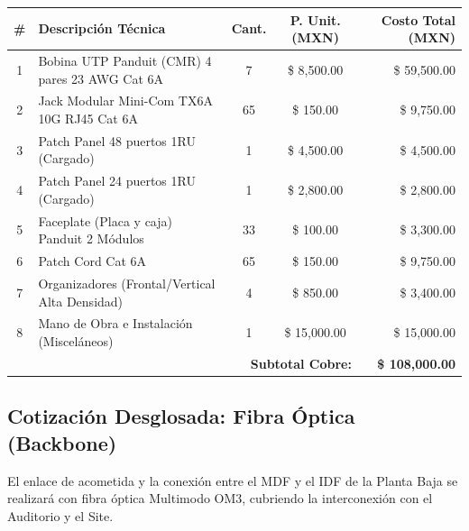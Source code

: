 \documentclass[11pt, letterpaper]{article}
\begin{document}
\begin{table}[h!]
\centering
{}
\renewcommand{\arraystretch}{1.3}
\begin{tabularx}{\textwidth}{@{} c X c c r @{}}
\toprule
\rowcolor{OroUNAM!20} %
\textbf{\#} & \textbf{Descripción Técnica} & \textbf{Cant.} & \textbf{P. Unit. (MXN)} & \textbf{Costo Total (MXN)} \\ \midrule
1 & Bobina UTP Panduit (CMR) 4 pares 23 AWG Cat 6A & 7 & \$ 8,500.00 & \$ 59,500.00 \\
2 & Jack Modular Mini-Com TX6A 10G RJ45 Cat 6A & 65 & \$ 150.00 & \$ 9,750.00 \\
3 & Patch Panel 48 puertos 1RU (Cargado) & 1 & \$ 4,500.00 & \$ 4,500.00 \\
4 & Patch Panel 24 puertos 1RU (Cargado) & 1 & \$ 2,800.00 & \$ 2,800.00 \\
5 & Faceplate (Placa y caja) Panduit 2 Módulos & 33 & \$ 100.00 & \$ 3,300.00 \\
6 & Patch Cord Cat 6A & 65 & \$ 150.00 & \$ 9,750.00 \\
7 & Organizadores (Frontal/Vertical Alta Densidad) & 4 & \$ 850.00 & \$ 3,400.00 \\
8 & Mano de Obra e Instalación (Misceláneos) & 1 & \$ 15,000.00 & \$ 15,000.00 \\ \midrule
\multicolumn{4}{r}{\textbf{Subtotal Cobre:}} & \textbf{\textcolor{AzulUNAM}{\$ 108,000.00}} \\ \bottomrule
\end{tabularx}
\end{table}

\subsection{Cotización Desglosada: Fibra Óptica (Backbone)}
El enlace de acometida y la conexión entre el MDF y el IDF de la Planta Baja se realizará con fibra óptica Multimodo OM3, cubriendo la interconexión con el Auditorio y el Site.
\end{document}
